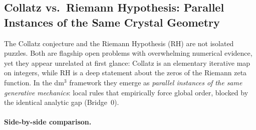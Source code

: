 %
%

\subsection{Collatz vs.\ Riemann Hypothesis: Parallel Instances of the Same Crystal Geometry}
\label{subsec:collatz_rh}

The Collatz conjecture and the Riemann Hypothesis (RH) are not isolated puzzles.
Both are flagship open problems with overwhelming numerical evidence, yet they appear
unrelated at first glance: Collatz is an elementary iterative map on integers, while RH is
a deep statement about the zeros of the Riemann zeta function.
In the dm$^3$ framework they emerge as \emph{parallel instances of the same generative
mechanics}: local rules that empirically force global order, blocked by the identical
analytic gap (Bridge~0).

\paragraph{Side-by-side comparison.}

